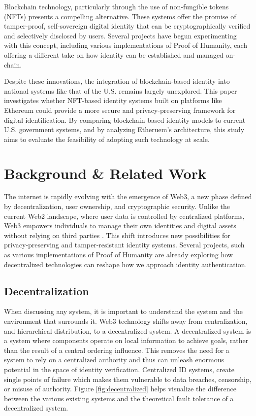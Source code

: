 \documentclass[conference]{IEEEtran}
\begin{document}
Blockchain technology, particularly through the use of non-fungible tokens (NFTs) presents a compelling alternative. These systems offer the promise of tamper-proof, self-sovereign digital identity that can be cryptographically verified and selectively disclosed by users. Several projects have begun experimenting with this concept, including various implementations of Proof of Humanity, each offering a different take on how identity can be established and managed on-chain.

Despite these innovations, the integration of blockchain-based identity into national systems like that of the U.S. remains largely unexplored. This paper investigates whether NFT-based identity systems built on platforms like Ethereum could provide a more secure and privacy-preserving framework for digital identification. By comparing blockchain-based identity models to current U.S. government systems, and by analyzing Etheruem's architecture, this study aims to evaluate the feasibility of adopting such technology at scale.


\section{Background \& Related Work}
The internet is rapidly evolving with the emergence of Web3, a new phase defined by decentralization, user ownership, and cryptographic security. Unlike the current Web2 landscape, where user data is controlled by centralized platforms, Web3 empowers individuals to manage their own identities and digital assets without relying on third parties \cite{what-is-web3}. This shift introduces new possibilities for privacy-preserving and tamper-resistant identity systems. Several projects, such as various implementations of Proof of Humanity are already exploring how decentralized technologies can reshape how we approach identity authentication.

\subsection{Decentralization}
When discussing any system, it is important to understand the system and the environment that surrounds it. Web3 technology shifts away from centralization, and hierarchical distribution, to a decentralized system. A decentralized system is a system where components operate on local information to achieve goals, rather than the result of a central ordering influence. This removes the need for a system to rely on a centralized authority and thus can unleash enormous potential in the space of identity verification. Centralized ID systems, create single points of failure which makes them vulnerable to data breaches, censorship, or misuse of authority. Figure \ref{fig:decentralized} helps visualize the difference between the various existing systems and the theoretical fault tolerance of a decentralized system.
\end{document}
